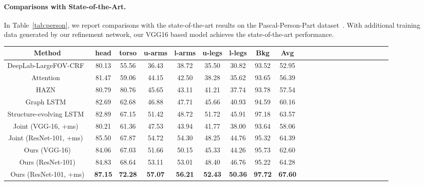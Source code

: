 \documentclass[10pt,twocolumn,letterpaper]{article}
\begin{document}
\paragraph{Comparisons with State-of-the-Art.}
In Table~\ref{tab:person}, we report comparisons with the state-of-the-art results on the Pascal-Person-Part dataset~\cite{chen2014detect}. With additional training data generated by our refinement network, our VGG16 based model achieves the state-of-the-art performance.
\begin{table*}[!tp]\setlength{\tabcolsep}{2pt}
	\centering
	\begin{tabular}{cccccccccccccccccccccc}
		\toprule
		{Method} &  head   &  torso  &  u-arms  & l-arms & u-legs & l-legs & Bkg & Avg \\
		\midrule
		DeepLab-LargeFOV-CRF~\cite{chen2015deeplab}  & 80.13 & 55.56 & 36.43 & 38.72 & 35.50 & 30.82 & 93.52 & 52.95 \\
		Attention~\cite{chen2016attention} & 81.47 & 59.06 & 44.15 & 42.50 & 38.28 & 35.62 & 93.65 & 56.39\\
        HAZN~\cite{xia2016zoom} & {80.79} & 80.76 & 45.65 & 43.11 & 41.21 & 37.74 & 93.78 & 57.54\\
		Graph LSTM~\cite{liang2016semantic} & {82.69} & {62.68} & {46.88} & {47.71} & {45.66} & {40.93} & {94.59} & {60.16} \\
		Structure-evolving LSTM~\cite{liang2017interpretable} & 82.89 & 67.15 & 51.42 & 48.72 & 51.72 & 45.91 & 97.18 & 63.57\\
        \midrule
        Joint (VGG-16, +ms)~\cite{xia2017joint} & 80.21 & 61.36 & 47.53 & 43.94 & 41.77 & 38.00 & 93.64  & 58.06\\
		Joint (ResNet-101, +ms)~\cite{xia2017joint} & 85.50 & 67.87 & 54.72 & 54.30 & 48.25 & 44.76  & 95.32  & 64.39\\
        \midrule
        Ours (VGG-16) & 84.06 & 67.03 & 51.66 & 50.15 & 45.33 & 44.26 & 95.73  & 62.60\\
        Ours (ResNet-101) & 84.83 & 68.64 & 53.11 & 53.01 & 48.40 & 46.76  & 95.22  & 64.28\\
        Ours (ResNet-101, +ms) & \textbf{87.15} & \textbf{72.28} & \textbf{57.07} & \textbf{56.21} & \textbf{52.43} & \textbf{50.36}  & \textbf{97.72}  & \textbf{67.60}\\
		\bottomrule
	\end{tabular}\caption{Comparison of semantic object parsing performance with several state-of-the-art methods on the PASCAL-Person-Part dataset~\cite{chen2014detect}. ``+ms'' denotes testing with multi-scale inputs. Note that we only perform single scale testing for our VGG-16 entry since the base network~\cite{chen2016attention} has explicitly utilized multi-scale features.}\label{tab:person}
	\vspace{-4mm}
\end{table*}
\end{document}
